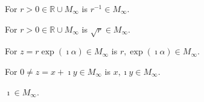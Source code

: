 \begin{lemma}
    \label{lem:construction_inv_pos_real}
    For $r > 0\in \mathbb{R}\cup M_{\infty}$ is $r^{-1} \in M_{\infty}$.
\end{lemma}

\begin{lemma}
    \label{lem:construction_sqrt_pos_real}
    For $r > 0 \in \mathbb{R}\cup M_{\infty}$ is $\sqrt{r} \in M_{\infty}$.
\end{lemma}

\begin{lemma}
    \label{lem:construction_polar}
    For $z = r \exp(\imath \alpha) \in M_{\infty}$ is $r, \allowbreak \exp(\imath \alpha) \in M_{\infty}$.
\end{lemma}

\begin{lemma}
    \label{lem:construction_re_im}
    For $0 \ne z = x + \imath y \in M_{\infty}$ is $x, \imath y \in M_{\infty}$.
\end{lemma}

\begin{lemma}
    \label{lem:construction_imath}
    $\imath \in M_{\infty}$.
\end{lemma}
